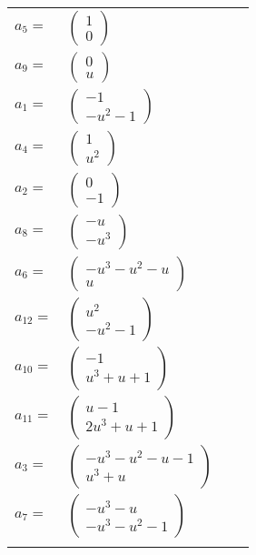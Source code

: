 \documentclass[1p]{elsarticle_modified}
\theoremstyle{definition}
\begin{document}
\begin{tabular}{m{7pt} m{180pt} m{7pt} m{180pt} }
\flushright $a_{5}=$&$\begin{pmatrix}1\\0\end{pmatrix}$ \\
\flushright $a_{9}=$&$\begin{pmatrix}0\\u\end{pmatrix}$ \\
\flushright $a_{1}=$&$\begin{pmatrix}-1\\- u^2-1\end{pmatrix}$ \\
\flushright $a_{4}=$&$\begin{pmatrix}1\\u^2\end{pmatrix}$ \\
\flushright $a_{2}=$&$\begin{pmatrix}0\\-1\end{pmatrix}$ \\
\flushright $a_{8}=$&$\begin{pmatrix}- u\\- u^3\end{pmatrix}$ \\
\flushright $a_{6}=$&$\begin{pmatrix}- u^3- u^2- u\\u\end{pmatrix}$ \\
\flushright $a_{12}=$&$\begin{pmatrix}u^2\\- u^2-1\end{pmatrix}$ \\
\flushright $a_{10}=$&$\begin{pmatrix}-1\\u^3+u+1\end{pmatrix}$ \\
\flushright $a_{11}=$&$\begin{pmatrix}u-1\\2 u^3+u+1\end{pmatrix}$ \\
\flushright $a_{3}=$&$\begin{pmatrix}- u^3- u^2- u-1\\u^3+u\end{pmatrix}$ \\
\flushright $a_{7}=$&$\begin{pmatrix}- u^3- u\\- u^3- u^2-1\end{pmatrix}$\\&\end{tabular}
\end{document}
